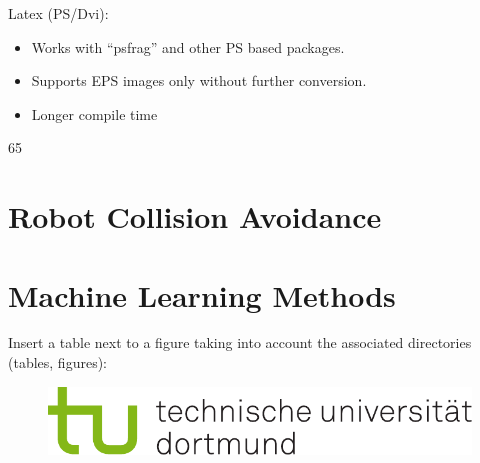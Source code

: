 Latex (PS/Dvi):
\begin{itemize}
	\item Works with "`psfrag"' and other PS based packages.
	\item Supports EPS images only without further conversion.
	\item Longer compile time
\end{itemize}65


\section{Robot Collision Avoidance}
\section{Machine Learning Methods}
Insert a table next to a figure taking into account the associated directories (tables, figures):
\begin{figure}[htbp]
%
	\begin{minipage}[t]{0.45\textwidth}
	\centering
	\label{tab:bsp2}
	\end{minipage}
%
	\begin{minipage}[t]{0.45\textwidth}
	\centering
	  \includegraphics[width=\textwidth]{images/logos/tud_logo_rgb}
	\end{minipage}
\end{figure}


